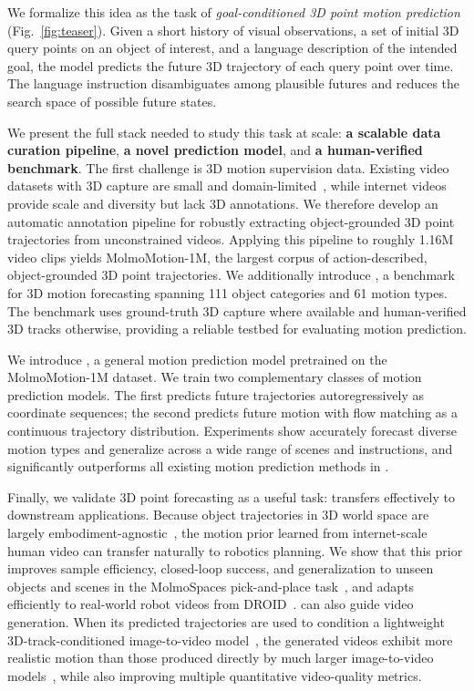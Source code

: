 We formalize this idea as the task of \textit{goal-conditioned 3D point motion prediction} (Fig.~\ref{fig:teaser}). Given a short history of visual observations, a set of initial 3D query points on an object of interest, and a language description of the intended goal, the model predicts the future 3D trajectory of each query point over time. The language instruction disambiguates among plausible futures and reduces the search space of possible future states.


We present the full stack needed to study this task at scale: \textbf{a scalable data curation pipeline}, \textbf{a novel prediction model}, and \textbf{a human-verified benchmark}. The first challenge is 3D motion supervision data. Existing video datasets with 3D capture are small and domain-limited~\cite{hot3d, koppula2024tapvid3d, liu2022hoi4d}, while internet videos provide scale and diversity but lack 3D annotations. We therefore develop an automatic annotation pipeline for robustly extracting object-grounded 3D point trajectories from unconstrained videos. Applying this pipeline to roughly 1.16M video clips yields MolmoMotion-1M, the largest corpus of action-described, object-grounded 3D point trajectories. We additionally introduce \benchmarkname{}, a benchmark for 3D motion forecasting spanning 111 object categories and 61 motion types. The benchmark uses ground-truth 3D capture where available and human-verified 3D tracks otherwise, providing a reliable testbed for evaluating motion prediction.

We introduce \modelname, a general motion prediction model pretrained on the MolmoMotion-1M dataset. We train two complementary classes of motion prediction models. The first predicts future trajectories autoregressively as coordinate sequences; the second predicts future motion with flow matching as a continuous trajectory distribution. 
Experiments show \modelname accurately forecast diverse motion types and generalize across a wide range of scenes and instructions, and significantly outperforms all existing motion prediction methods in \benchmarkname{}.


Finally, we validate 3D point forecasting as a useful task: \modelname transfers effectively to downstream applications.
Because object trajectories in 3D world space are largely embodiment-agnostic~\cite{track2act, dharmarajan2025dream2flow}, the motion prior learned from internet-scale human video can transfer naturally to robotics planning. We show that this prior improves sample efficiency, closed-loop success, and generalization to unseen objects and scenes in the MolmoSpaces pick-and-place task~\cite{molmospaces}, and adapts efficiently to real-world robot videos from DROID~\cite{droid}.
\modelname can also guide video generation. When its predicted trajectories are used to condition a lightweight 3D-track-conditioned image-to-video model~\cite{gu2025diffusionasshader}, the generated videos exhibit more realistic motion than those produced directly by much larger image-to-video models~\cite{wan22}, while also improving multiple quantitative video-quality metrics.

